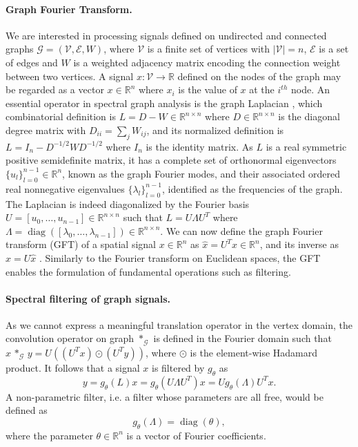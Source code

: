 \documentclass{article}
\DeclareMathOperator*{\diag}{diag}
\newcommand{\G}{\mathcal{G}}
\newcommand{\V}{\mathcal{V}}
\newcommand{\E}{\mathcal{E}}
\newcommand{\R}{\mathbb{R}}
\begin{document}
\paragraph{Graph Fourier Transform.} We are interested in processing signals
defined on undirected and connected graphs $\G=(\V,\E,W)$, where $\V$ is a
finite set of vertices with $|\V|=n$, $\E$ is a set of edges and $W$ is a
weighted adjacency matrix encoding the connection weight between two vertices. A
signal $x: \V \rightarrow \R$ defined on the nodes of the graph may be regarded
as a vector $x \in \R^n$ where $x_i$ is the value of $x$ at the $i^{th}$ node.
An essential operator in spectral graph analysis is the graph Laplacian
\cite{book:Chung97Spectral}, which combinatorial definition is $L = D - W \in
\R^{n \times n}$ where $D \in \R^{n \times n}$ is the diagonal degree matrix
with $D_{ii} = \sum_j W_{ij}$, and its normalized definition is $L = I_n -
D^{-1/2} W D^{-1/2}$ where $I_n$ is the identity matrix. As $L$ is a real
symmetric positive semidefinite matrix, it has a complete set of orthonormal
eigenvectors $\{u_l\}_{l=0}^{n-1} \in \R^n$, known as the graph Fourier modes,
and their associated ordered real nonnegative eigenvalues
$\{\lambda_l\}_{l=0}^{n-1}$, identified as the frequencies of the graph. The
Laplacian is indeed diagonalized by the Fourier basis $U=[u_0, \ldots, u_{n-1}]
\in \R^{n \times n}$ such that $L = U \Lambda U^T$ where $\Lambda =
\diag([\lambda_0, \ldots, \lambda_{n-1}]) \in \R^{n \times n}$. We can now
define the graph Fourier transform (GFT) of a spatial signal $x \in \R^n$ as
$\hat{x} = U^T x \in \R^n$, and its inverse as $x = U \hat{x}$
\cite{art:ShumanNarangFrossardOrtegaVandergheynst13ReviewSPG}. Similarly to the
Fourier transform on Euclidean spaces, the GFT enables the formulation of
fundamental operations such as filtering.

\paragraph{Spectral filtering of graph signals.} As we cannot express a
meaningful translation operator in the vertex domain, the convolution operator
on graph $\ast_\G$ is defined in the Fourier domain such that $x \,\ast_\G\, y =
U((U^Tx) \odot (U^Ty))$, where $\odot$ is the element-wise Hadamard product. It
follows that a signal $x$ is filtered by $g_\theta$ as
\begin{equation}
	y = g_\theta(L) x = g_\theta(U \Lambda U^T) x = U g_\theta(\Lambda) U^T x.
\end{equation}
A non-parametric filter, i.e. a filter whose parameters
are all free, would be defined as
\begin{equation} \label{eq:filt_non-param}
	g_\theta(\Lambda) = \diag(\theta),
\end{equation}
where the parameter $\theta \in \R^n$ is a vector of Fourier coefficients.
\end{document}
